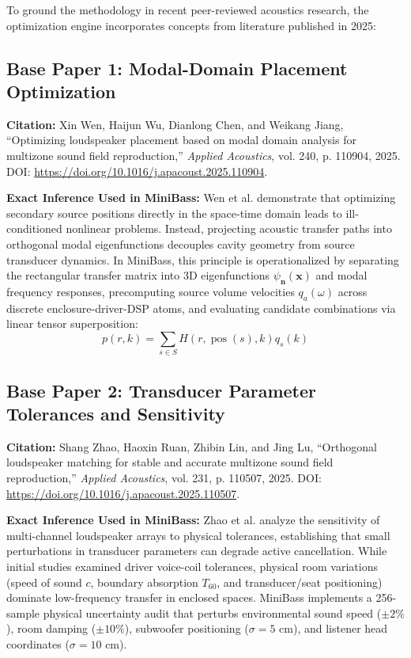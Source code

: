 \documentclass[11pt,a4paper]{article}
\begin{document}
To ground the methodology in recent peer-reviewed acoustics research, the optimization engine incorporates concepts from literature published in 2025:

\subsection{Base Paper 1: Modal-Domain Placement Optimization}
\noindent \textbf{Citation:} Xin Wen, Haijun Wu, Dianlong Chen, and Weikang Jiang, ``Optimizing loudspeaker placement based on modal domain analysis for multizone sound field reproduction,'' \textit{Applied Acoustics}, vol. 240, p. 110904, 2025. DOI: \url{https://doi.org/10.1016/j.apacoust.2025.110904}.

\noindent \textbf{Exact Inference Used in MiniBass:}
Wen et al. demonstrate that optimizing secondary source positions directly in the space-time domain leads to ill-conditioned nonlinear problems. Instead, projecting acoustic transfer paths into orthogonal modal eigenfunctions decouples cavity geometry from source transducer dynamics. 
In MiniBass, this principle is operationalized by separating the rectangular transfer matrix into 3D eigenfunctions $\psi_{\mathbf{n}}(\mathbf{x})$ and modal frequency responses, precomputing source volume velocities $q_a(\omega)$ across discrete enclosure-driver-DSP atoms, and evaluating candidate combinations via linear tensor superposition:
\begin{equation}
    p(r, k) = \sum_{s \in S} H(r, \operatorname{pos}(s), k) q_s(k)
\end{equation}

\subsection{Base Paper 2: Transducer Parameter Tolerances and Sensitivity}
\noindent \textbf{Citation:} Shang Zhao, Haoxin Ruan, Zhibin Lin, and Jing Lu, ``Orthogonal loudspeaker matching for stable and accurate multizone sound field reproduction,'' \textit{Applied Acoustics}, vol. 231, p. 110507, 2025. DOI: \url{https://doi.org/10.1016/j.apacoust.2025.110507}.

\noindent \textbf{Exact Inference Used in MiniBass:}
Zhao et al. analyze the sensitivity of multi-channel loudspeaker arrays to physical tolerances, establishing that small perturbations in transducer parameters can degrade active cancellation. While initial studies examined driver voice-coil tolerances, physical room variations (speed of sound $c$, boundary absorption $T_{60}$, and transducer/seat positioning) dominate low-frequency transfer in enclosed spaces. MiniBass implements a 256-sample physical uncertainty audit that perturbs environmental sound speed ($\pm 2\%$), room damping ($\pm 10\%$), subwoofer positioning ($\sigma = 5\text{ cm}$), and listener head coordinates ($\sigma = 10\text{ cm}$).
\end{document}
